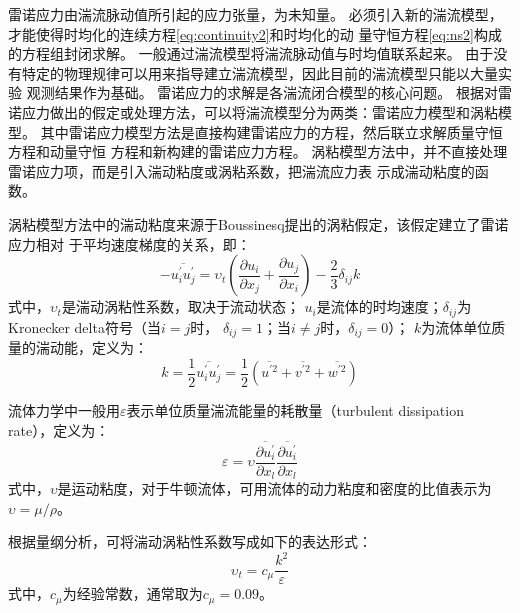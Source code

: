 雷诺应力由湍流脉动值所引起的应力张量，为未知量。
必须引入新的湍流模型，才能使得时均化的连续方程\eqref{eq:continuity2}和时均化的动
量守恒方程\eqref{eq:ns2}构成的方程组封闭求解。
一般通过湍流模型将湍流脉动值与时均值联系起来。
由于没有特定的物理规律可以用来指导建立湍流模型，因此目前的湍流模型只能以大量实验
观测结果作为基础。
雷诺应力的求解是各湍流闭合模型的核心问题。
根据对雷诺应力做出的假定或处理方法，可以将湍流模型分为两类：雷诺应力模型和涡粘模
型。
其中雷诺应力模型方法是直接构建雷诺应力的方程，然后联立求解质量守恒方程和动量守恒
方程和新构建的雷诺应力方程。
涡粘模型方法中，并不直接处理雷诺应力项，而是引入湍动粘度或涡粘系数，把湍流应力表
示成湍动粘度的函数。

涡粘模型方法中的湍动粘度来源于Boussinesq提出的涡粘假定，该假定建立了雷诺应力相对
于平均速度梯度的关系，即：
\begin{equation}
  \label{eq:bou}
  -\overline{u_i^{'} u_j^{'}} = \upsilon_t \left( \frac{\partial u_i}{\partial x_j} +
    \frac{\partial u_j}{\partial x_i}\right)
  - \frac{2}{3} \delta_{ij} k
\end{equation}
式中，$\upsilon_t$是湍动涡粘性系数，取决于流动状态；
$u_i$是流体的时均速度；$\delta_{ij}$为Kronecker delta符号（当$i=j$时，
$\delta_{ij}=1$；当$i \neq j$时，$\delta_{ij}=0$）；
$k$为流体单位质量的湍动能，定义为：
\begin{equation}
  \label{eq:k}
  k = \frac{1}{2}\overline{u_i^{'} u_j^{'}} =
  \frac{1}{2}\left( \overline{u^{'2}} + \overline{v^{'2}} + \overline{w^{'2}} \right)
\end{equation}

流体力学中一般用$\varepsilon$表示单位质量湍流能量的耗散量（turbulent dissipation
rate），定义为：
\begin{equation}
  \label{eq:epsilon}
  \varepsilon = \upsilon \overline{\frac{\partial u_i^{'}}{\partial x_l}}
  \overline{\frac{\partial u_i^{'}}{\partial x_l}}
\end{equation}
式中，$\upsilon$是运动粘度，对于牛顿流体，可用流体的动力粘度和密度的比值表示为
$\upsilon = \mu/\rho$。

根据量纲分析，可将湍动涡粘性系数写成如下的表达形式：
\begin{equation}
  {\upsilon_t} = {c_\mu }\frac{{{k^2}}}{\varepsilon }
\end{equation}
式中，$c_\mu$为经验常数，通常取为$c_\mu=0.09$。

